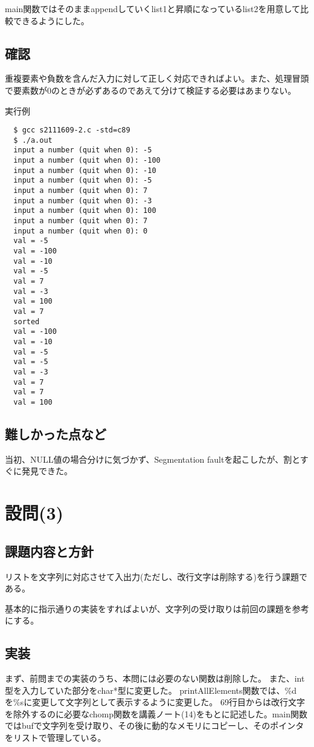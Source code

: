 \documentclass[dvipdfmx,12pt,a4j]{jarticle}
\begin{document}
main関数ではそのままappendしていくlist1と昇順になっているlist2を用意して比較できるようにした。




\subsection{確認}
重複要素や負数を含んだ入力に対して正しく対応できればよい。また、処理冒頭で要素数が0のときが必ずあるのであえて分けて検証する必要はあまりない。

\begin{itembox}[l]{実行例}
\begin{verbatim}
  $ gcc s2111609-2.c -std=c89
  $ ./a.out
  input a number (quit when 0): -5
  input a number (quit when 0): -100
  input a number (quit when 0): -10
  input a number (quit when 0): -5
  input a number (quit when 0): 7
  input a number (quit when 0): -3
  input a number (quit when 0): 100
  input a number (quit when 0): 7
  input a number (quit when 0): 0
  val = -5
  val = -100
  val = -10
  val = -5
  val = 7
  val = -3
  val = 100
  val = 7
  sorted
  val = -100
  val = -10
  val = -5
  val = -5
  val = -3
  val = 7
  val = 7
  val = 100
\end{verbatim}
\end{itembox}

\subsection{難しかった点など}
当初、NULL値の場合分けに気づかず、Segmentation faultを起こしたが、割とすぐに発見できた。


\section{設問(3)}
\subsection{課題内容と方針}
リストを文字列に対応させて入出力(ただし、改行文字は削除する)を行う課題である。

基本的に指示通りの実装をすればよいが、文字列の受け取りは前回の課題を参考にする。

\subsection{実装}
まず、前問までの実装のうち、本問には必要のない関数は削除した。
また、int型を入力していた部分をchar*型に変更した。
printAllElements関数では、\%dを\%sに変更して文字列として表示するように変更した。
69行目からは改行文字を除外するのに必要なchomp関数を講義ノート(14)をもとに記述した。main関数ではbufで文字列を受け取り、その後に動的なメモリにコピーし、そのポインタをリストで管理している。

\end{document}
